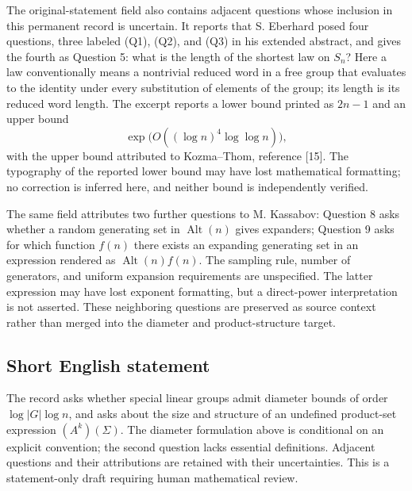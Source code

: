 \documentclass[11pt]{article}
\begin{document}
The original-statement field also contains adjacent questions whose inclusion in this permanent record is uncertain. It reports that S. Eberhard posed four questions, three labeled (Q1), (Q2), and (Q3) in his extended abstract, and gives the fourth as Question 5: what is the length of the shortest law on \(S_n\)? Here a law conventionally means a nontrivial reduced word in a free group that evaluates to the identity under every substitution of elements of the group; its length is its reduced word length. The excerpt reports a lower bound printed as \(2n-1\) and an upper bound
\[
\exp\!\bigl(O((\log n)^4\log\log n)\bigr),
\]
with the upper bound attributed to Kozma--Thom, reference [15]. The typography of the reported lower bound may have lost mathematical formatting; no correction is inferred here, and neither bound is independently verified.

The same field attributes two further questions to M. Kassabov: Question 8 asks whether a random generating set in \(\operatorname{Alt}(n)\) gives expanders; Question 9 asks for which function \(f(n)\) there exists an expanding generating set in an expression rendered as \(\operatorname{Alt}(n)f(n)\). The sampling rule, number of generators, and uniform expansion requirements are unspecified. The latter expression may have lost exponent formatting, but a direct-power interpretation is not asserted. These neighboring questions are preserved as source context rather than merged into the diameter and product-structure target.
\subsection{Short English statement}
The record asks whether special linear groups admit diameter bounds of order \(\log|G|\log n\), and asks about the size and structure of an undefined product-set expression \((A^k)(\Sigma)\). The diameter formulation above is conditional on an explicit convention; the second question lacks essential definitions. Adjacent questions and their attributions are retained with their uncertainties. This is a statement-only draft requiring human mathematical review.
\end{document}
